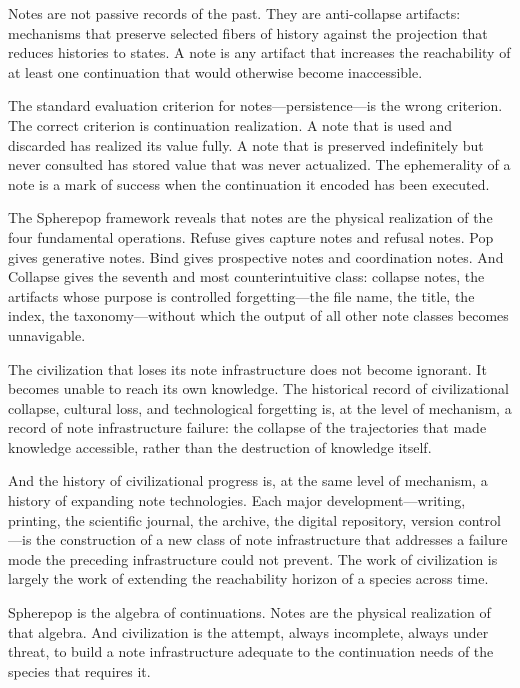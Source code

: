 \documentclass[12pt, a4paper]{article}
\theoremstyle{plain}
\theoremstyle{definition}
\theoremstyle{remark}
\begin{document}
Notes are not passive records of the past. They are anti-collapse artifacts:
mechanisms that preserve selected fibers of history against the projection that
reduces histories to states. A note is any artifact that increases the reachability
of at least one continuation that would otherwise become inaccessible.

The standard evaluation criterion for notes---persistence---is the wrong criterion.
The correct criterion is continuation realization. A note that is used and discarded
has realized its value fully. A note that is preserved indefinitely but never
consulted has stored value that was never actualized. The ephemerality of a note
is a mark of success when the continuation it encoded has been executed.

The Spherepop framework reveals that notes are the physical realization of the four
fundamental operations. Refuse gives capture notes and refusal notes. Pop gives
generative notes. Bind gives prospective notes and coordination notes. And Collapse
gives the seventh and most counterintuitive class: collapse notes, the artifacts
whose purpose is controlled forgetting---the file name, the title, the index, the
taxonomy---without which the output of all other note classes becomes unnavigable.

The civilization that loses its note infrastructure does not become ignorant. It
becomes unable to reach its own knowledge. The historical record of civilizational
collapse, cultural loss, and technological forgetting is, at the level of mechanism,
a record of note infrastructure failure: the collapse of the trajectories that made
knowledge accessible, rather than the destruction of knowledge itself.

And the history of civilizational progress is, at the same level of mechanism,
a history of expanding note technologies. Each major development---writing,
printing, the scientific journal, the archive, the digital repository, version
control---is the construction of a new class of note infrastructure that addresses
a failure mode the preceding infrastructure could not prevent. The work of
civilization is largely the work of extending the reachability horizon of a
species across time.

\medskip

Spherepop is the algebra of continuations. Notes are the physical realization of
that algebra. And civilization is the attempt, always incomplete, always under
threat, to build a note infrastructure adequate to the continuation needs of the
species that requires it.
\end{document}
